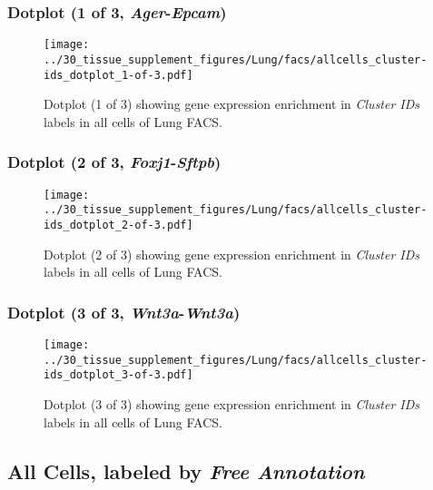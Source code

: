 \clearpage

\subsubsection{Dotplot (1 of 3, \emph{Ager}-\emph{Epcam})}
\begin{figure}[h]
\centering
\texttt{[image: ../30\_tissue\_supplement\_figures/Lung/facs/allcells\_cluster-ids\_dotplot\_1-of-3.pdf]}

\caption{ Dotplot (1 of 3)  showing gene expression enrichment in \emph{Cluster IDs} labels in all cells of Lung FACS. }
\end{figure}


\clearpage

\subsubsection{Dotplot (2 of 3, \emph{Foxj1}-\emph{Sftpb})}
\begin{figure}[h]
\centering
\texttt{[image: ../30\_tissue\_supplement\_figures/Lung/facs/allcells\_cluster-ids\_dotplot\_2-of-3.pdf]}

\caption{ Dotplot (2 of 3)  showing gene expression enrichment in \emph{Cluster IDs} labels in all cells of Lung FACS. }
\end{figure}


\clearpage

\subsubsection{Dotplot (3 of 3, \emph{Wnt3a}-\emph{Wnt3a})}
\begin{figure}[h]
\centering
\texttt{[image: ../30\_tissue\_supplement\_figures/Lung/facs/allcells\_cluster-ids\_dotplot\_3-of-3.pdf]}

\caption{ Dotplot (3 of 3)  showing gene expression enrichment in \emph{Cluster IDs} labels in all cells of Lung FACS. }
\end{figure}


\clearpage

\subsection{All Cells, labeled by \emph{Free Annotation}}
